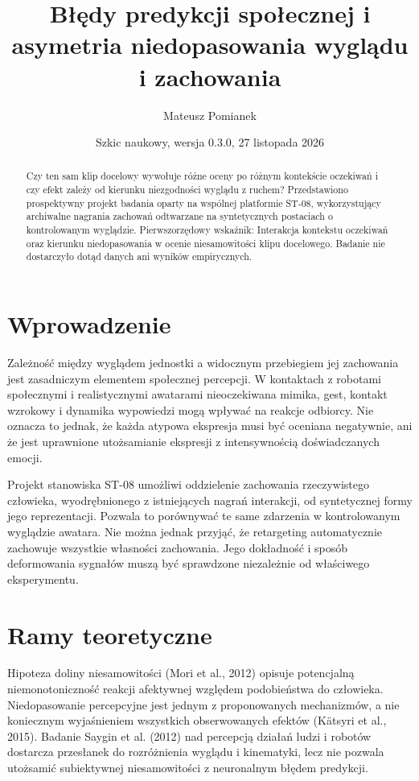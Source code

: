 \documentclass[11pt,a4paper]{article}
\title{Błędy predykcji społecznej i asymetria niedopasowania wyglądu i zachowania}
\author{Mateusz Pomianek}
\date{Szkic naukowy, wersja 0.3.0, 27 listopada 2026}
\begin{document}
\maketitle
\begin{abstract}
Czy ten sam klip docelowy wywołuje różne oceny po różnym kontekście oczekiwań i czy efekt zależy od kierunku niezgodności wyglądu z ruchem? Przedstawiono prospektywny projekt badania oparty na wspólnej platformie ST-08, wykorzystujący archiwalne nagrania zachowań odtwarzane na syntetycznych postaciach o kontrolowanym wyglądzie. Pierwszorzędowy wskaźnik: Interakcja kontekstu oczekiwań oraz kierunku niedopasowania w ocenie niesamowitości klipu docelowego. Badanie nie dostarczyło dotąd danych ani wyników empirycznych.
\end{abstract}
\section{Wprowadzenie}
Zależność między wyglądem jednostki a widocznym przebiegiem jej zachowania jest zasadniczym elementem społecznej percepcji. W kontaktach z robotami społecznymi i realistycznymi awatarami nieoczekiwana mimika, gest, kontakt wzrokowy i dynamika wypowiedzi mogą wpływać na reakcje odbiorcy. Nie oznacza to jednak, że każda atypowa ekspresja musi być oceniana negatywnie, ani że jest uprawnione utożsamianie ekspresji z intensywnością doświadczanych emocji.

Projekt stanowiska ST-08 umożliwi oddzielenie zachowania rzeczywistego człowieka, wyodrębnionego z istniejących nagrań interakcji, od syntetycznej formy jego reprezentacji. Pozwala to porównywać te same zdarzenia w kontrolowanym wyglądzie awatara. Nie można jednak przyjąć, że retargeting automatycznie zachowuje wszystkie własności zachowania. Jego dokładność i sposób deformowania sygnałów muszą być sprawdzone niezależnie od właściwego eksperymentu.
\section{Ramy teoretyczne}
Hipoteza doliny niesamowitości (Mori et al., 2012) opisuje potencjalną niemonotoniczność reakcji afektywnej względem podobieństwa do człowieka. Niedopasowanie percepcyjne jest jednym z proponowanych mechanizmów, a nie koniecznym wyjaśnieniem wszystkich obserwowanych efektów (Kätsyri et al., 2015). Badanie Saygin et al. (2012) nad percepcją działań ludzi i robotów dostarcza przesłanek do rozróżnienia wyglądu i kinematyki, lecz nie pozwala utożsamić subiektywnej niesamowitości z neuronalnym błędem predykcji.
\end{document}
